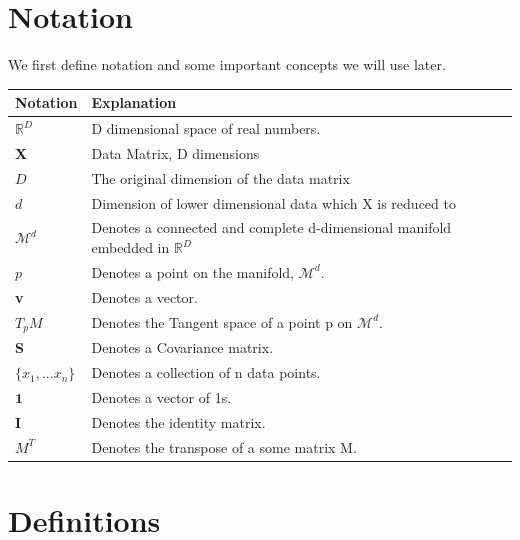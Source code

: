\documentclass[12pt]{report}
\begin{document}
\newpage

\section{Notation}

We first define notation and some important concepts we will use later.

\begin{table}[h]
\begin{tabular}{|l|l|}
\hline
\textbf{Notation} & \textbf{Explanation}                                      \\ \hline
$\mathbb{R}^D$    & D dimensional space of real numbers.                      \\ \hline
\textbf{X}        & Data Matrix, D dimensions                                 \\ \hline
$D$                & The original dimension of the data matrix                 \\ \hline
$d$               & Dimension of lower dimensional data which X is reduced to \\ \hline
$\mathcal{M}^d$      & Denotes a connected and complete d-dimensional manifold
                   embedded in $\mathbb{R}^D$                                 \\ \hline
$p$               & Denotes a point on the manifold, $\mathcal{M}^d$.            \\ \hline
\textbf{v}        & Denotes a vector.                                         \\ \hline
$T_pM$            & Denotes the Tangent space of a point p on $\mathcal{M}^d$.   \\ \hline
\textbf{S}        & Denotes a Covariance matrix.                               \\ \hline
$\{x_1,...x_n\}$  & Denotes a collection of n data points.        \\ \hline
$\mathbf{1}$      & Denotes a vector of 1s.                                   \\ \hline
$\textbf{I}$      & Denotes the identity matrix.                               \\ \hline
$M^T$             & Denotes the transpose of a some matrix M.                 \\ \hline
\end{tabular}
\end{table}

\newpage

\section{Definitions}
\end{document}
